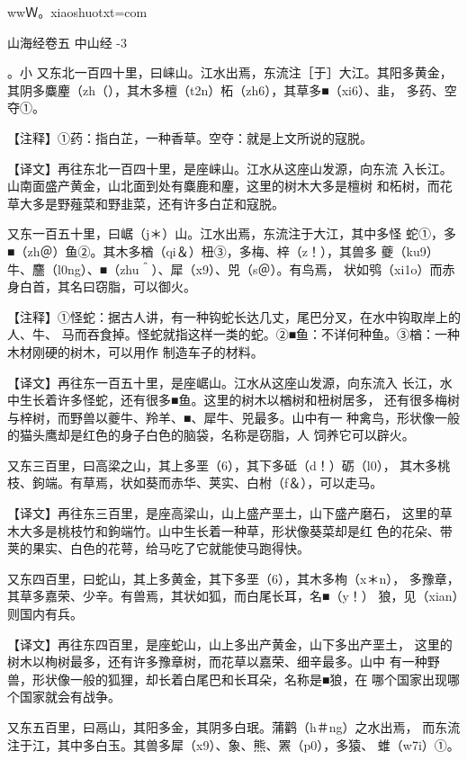 \documentclass[a4paper,12pt,UTF8,twoside]{ctexbook}
\begin{document}
wwＷ。xiaoshuotxt=com



山海经卷五 中山经 -3

。小%
又东北一百四十里，曰崃山。江水出焉，东流注［于］大江。其阳多黄金， 其阴多麋麈（zh（），其木多檀（t2n）柘（zh6），其草多■（xi6）、韭， 多药、空夺①。

【注释】①药：指白芷，一种香草。空夺：就是上文所说的寇脱。

【译文】再往东北一百四十里，是座崃山。江水从这座山发源，向东流 入长江。山南面盛产黄金，山北面到处有麋鹿和麈，这里的树木大多是檀树 和柘树，而花草大多是野薤菜和野韭菜，还有许多白芷和寇脱。

又东一百五十里，曰崌（j＊）山。江水出焉，东流注于大江，其中多怪 蛇①，多■（zh＠）鱼②。其木多楢（qi＆）杻③，多梅、梓（z！），其兽多 夔（ku9）牛、麢（l0ng）、■（zhu＾）、犀（x9）、兕（s＠）。有鸟焉， 状如鸮（xi1o）而赤身白首，其名曰窃脂，可以御火。

【注释】①怪蛇：据古人讲，有一种钩蛇长达几丈，尾巴分叉，在水中钩取岸上的人、牛、 马而吞食掉。怪蛇就指这样一类的蛇。②■鱼：不详何种鱼。③楢：一种木材刚硬的树木，可以用作 制造车子的材料。

【译文】再往东一百五十里，是座崌山。江水从这座山发源，向东流入 长江，水中生长着许多怪蛇，还有很多■鱼。这里的树木以楢树和杻树居多， 还有很多梅树与梓树，而野兽以夔牛、羚羊、■、犀牛、兕最多。山中有一 种禽鸟，形状像一般的猫头鹰却是红色的身子白色的脑袋，名称是窃脂，人 饲养它可以辟火。

又东三百里，曰高梁之山，其上多垩（6），其下多砥（d！）砺（l0）， 其木多桃枝、鉤端。有草焉，状如葵而赤华、荚实、白柎（f＆），可以走马。

【译文】再往东三百里，是座高梁山，山上盛产垩土，山下盛产磨石， 这里的草木大多是桃枝竹和鉤端竹。山中生长着一种草，形状像葵菜却是红 色的花朵、带荚的果实、白色的花萼，给马吃了它就能使马跑得快。

又东四百里，曰蛇山，其上多黄金，其下多垩（6），其木多栒（x＊n）， 多豫章，其草多嘉荣、少辛。有兽焉，其状如狐，而白尾长耳，名■（y！） 狼，见（xian）则国内有兵。

【译文】再往东四百里，是座蛇山，山上多出产黄金，山下多出产垩土， 这里的树木以栒树最多，还有许多豫章树，而花草以嘉荣、细辛最多。山中 有一种野兽，形状像一般的狐狸，却长着白尾巴和长耳朵，名称是■狼，在 哪个国家出现哪个国家就会有战争。

又东五百里，曰鬲山，其阳多金，其阴多白珉。蒲鹳（h＃ng）之水出焉， 而东流注于江，其中多白玉。其兽多犀（x9）、象、熊、罴（p0），多猿、 蜼（w7i）①。
\end{document}
